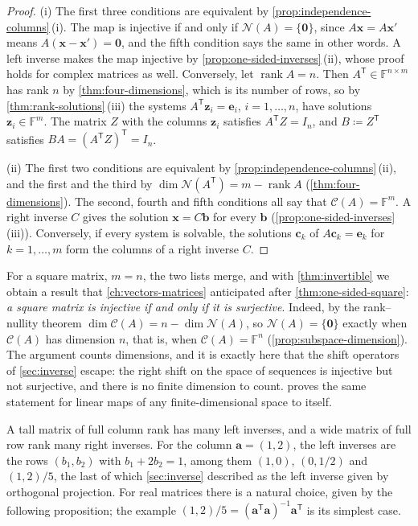 \begin{proof}
(i) The first three conditions are equivalent by \cref{prop:independence-columns}\,(i). The map is injective if and only if $\mathcal N(A)=\{\mathbf 0\}$, since $A\mathbf x=A\mathbf x'$ means $A(\mathbf x-\mathbf x')=\mathbf 0$, and the fifth condition says the same in other words. A left inverse makes the map injective by \cref{prop:one-sided-inverses}\,(ii), whose proof holds for complex matrices as well. Conversely, let $\operatorname{rank}A=n$. Then $A^{\mathsf T}\in\mathbb F^{n\times m}$ has rank $n$ by \cref{thm:four-dimensions}, which is its number of rows, so by \cref{thm:rank-solutions}\,(iii) the systems $A^{\mathsf T}\mathbf z_i=\mathbf e_i$, $i=1,\ldots,n$, have solutions $\mathbf z_i\in\mathbb F^m$. The matrix $Z$ with the columns $\mathbf z_i$ satisfies $A^{\mathsf T}Z=I_n$, and $B\coloneqq Z^{\mathsf T}$ satisfies $BA=(A^{\mathsf T}Z)^{\mathsf T}=I_n$.

(ii) The first two conditions are equivalent by \cref{prop:independence-columns}\,(ii), and the first and the third by $\dim\mathcal N(A^{\mathsf T})=m-\operatorname{rank}A$ (\cref{thm:four-dimensions}). The second, fourth and fifth conditions all say that $\mathcal C(A)=\mathbb F^m$. A right inverse $C$ gives the solution $\mathbf x=C\mathbf b$ for every $\mathbf b$ (\cref{prop:one-sided-inverses}\,(iii)). Conversely, if every system is solvable, the solutions $\mathbf c_k$ of $A\mathbf c_k=\mathbf e_k$ for $k=1,\ldots,m$ form the columns of a right inverse $C$.
\end{proof}

For a square matrix, $m=n$, the two lists merge, and with \cref{thm:invertible} we obtain a result that \cref{ch:vectors-matrices} anticipated after \cref{thm:one-sided-square}: \emph{a square matrix is injective if and only if it is surjective}. Indeed, by the rank--nullity theorem $\dim\mathcal C(A)=n-\dim\mathcal N(A)$, so $\mathcal N(A)=\{\mathbf 0\}$ exactly when $\mathcal C(A)$ has dimension $n$, that is, when $\mathcal C(A)=\mathbb F^n$ (\cref{prop:subspace-dimension}). The argument counts dimensions, and it is exactly here that the shift operators of \cref{sec:inverse} escape: the right shift on the space of sequences is injective but not surjective, and there is no finite dimension to count.  proves the same statement for linear maps of any finite-dimensional space to itself.

A tall matrix of full column rank has many left inverses, and a wide matrix of full row rank many right inverses. For the column $\mathbf a=(1,2)$, the left inverses are the rows $(b_1,b_2)$ with $b_1+2b_2=1$, among them $(1,0)$, $(0,1/2)$ and $(1,2)/5$, the last of which \cref{sec:inverse} described as the left inverse given by orthogonal projection. For real matrices there is a natural choice, given by the following proposition; the example $(1,2)/5=(\mathbf a^{\mathsf T}\mathbf a)^{-1}\mathbf a^{\mathsf T}$ is its simplest case.

